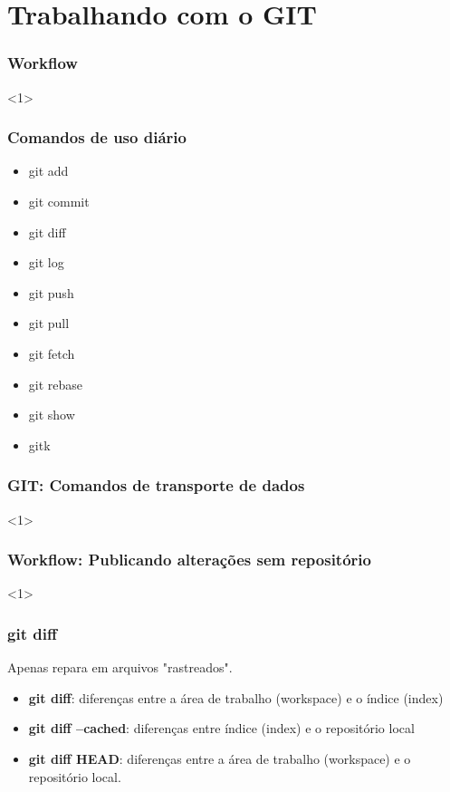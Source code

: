 \documentclass{beamer}
\begin{document}
\section{Trabalhando com o GIT}
\begin{frame}
\frametitle{Workflow}

<1>

\end{frame}


\begin{frame}
\frametitle{Comandos de uso diário}


\begin{itemize}
\item git add
\item git commit
\item git diff
\item git log
\item git push
\item git pull
\item git fetch
\item git rebase
\item git show
\item gitk
\end{itemize}


\end{frame}

\begin{frame}
\frametitle{GIT: Comandos de transporte de dados}

<1>

\end{frame}

\begin{frame}
\frametitle{Workflow: Publicando alterações sem repositório}

<1>

\end{frame}

\begin{frame}
\frametitle{git diff}


Apenas repara em arquivos "rastreados".

\begin{itemize}
\item \textbf{git diff}: diferenças entre a área de trabalho (workspace) e o índice (index)
\item \textbf{git diff --cached}: diferenças entre índice (index) e o repositório local
\item \textbf{git diff HEAD}: diferenças entre a área de trabalho (workspace) e o repositório local.
\end{itemize}
\end{frame}
\end{document}

